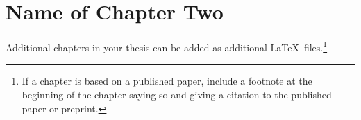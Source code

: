 \chapter{Name of Chapter Two} \label{ch:two}

Additional chapters in your thesis can be added as additional \LaTeX\
files.\footnote{If a chapter is based on a published paper, include a footnote
  at the beginning of the chapter saying so and giving a citation to the
  published paper or preprint.}
